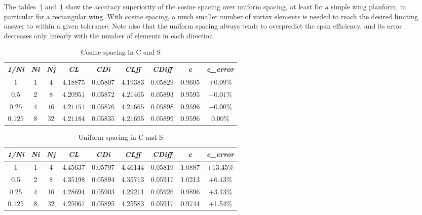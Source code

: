The tables~\ref{tab3} and~\ref{tab3} show the accuracy superiority of the cosine spacing 
over uniform spacing, at least for a simple wing planform, in particular for a rectangular wing.  With
cosine spacing, a much smaller number of vortex elements is needed
to reach the desired limiting answer to within a given tolerance.
Note also that the uniform spacing always tends to overpredict
the span efficiency, and its error decreases only linearly with 
the number of elements in each direction.\\

\begin{table} [!h]\centering {}
	\begin{tabular}{c c c c c c c c c}
		\toprule
		\textit{1/Ni}&  \textit{Ni}  &\textit{Nj} &  \textit{CL}  &     \textit{CDi}     &   \textit{CLff}  &   \textit{CDiff} &    \textit{e}  &   \textit{e\_error}  \\
		\midrule
	$ 1 $   	&   $ 1 $ 	&  $ 4 $  &  $ 4.18875 $ &  $ 0.05807 $ &  $ 4.19383 $ & $ 0.05829 $ &  $ 0.9605 $ & $ +0.09\% $ \\
	$ 0.5 $  	&  	$ 2 $  	&  $ 8 $  &  $ 4.20951 $ &  $ 0.05872 $ &  $ 4.21465 $ & $ 0.05893 $ &  $ 0.9595 $ & $ -0.01\% $ \\
	$ 0.25 $ 	& 	$ 4 $  	&  $ 16 $ &  $ 4.21151 $ &  $ 0.05876 $ &  $ 4.21665 $ & $ 0.05898 $ &  $ 0.9596 $ & $ -0.00\% $ \\
	$ 0.125 $ 	& 	$ 8 $  	&  $ 32 $ &  $ 4.21184 $ &  $ 0.05835 $ &  $ 4.21695 $ & $ 0.05899 $ &  $ 0.9596 $ & $ 0.00\% $  \\
		\bottomrule
	\end{tabular}
	\caption {\footnotesize Cosine spacing in C and S}
	\label{tab3}
\end{table}

\begin{table} [!h]\centering {}
	\begin{tabular}{c c c c c c c c c}
		\toprule
		\textit{1/Ni}&  \textit{Ni}  &\textit{Nj} &  \textit{CL}  &     \textit{CDi}     &   \textit{CLff}  &   \textit{CDiff} &    \textit{e}   &   \textit{e\_error}  \\
		\midrule
		1    &  1 &  4  & 4.45637 & 0.05797 & 4.46144 & 0.05819 &  1.0887 & +13.45\%   \\
		0.5  &  2 &  8  & 4.35198 & 0.05894 & 4.35713 & 0.05917 &  1.0213 &  +6.43\%  \\
		0.25 &  4 &  16 & 4.28694 & 0.05903 & 4.29211 & 0.05926 &  0.9896 &  +3.13\%  \\
		0.125 & 8 &   32 & 4.25067&  0.05895 & 4.25583 & 0.05917 &  0.9744 &  +1.54\% \\
		\bottomrule
	\end{tabular}
	\caption {\footnotesize Uniform spacing in C and S}
	\label{tab4}
\end{table}

